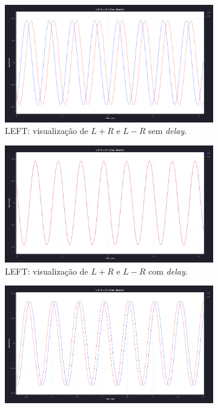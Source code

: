 \begin{figure}[ht] 
    \begin{subfigure}[b]{0.5\linewidth}
        \centering
        \includegraphics[width=0.9\linewidth]{img/peculiaridades/LEFT_sem_delay.png}
        \caption{LEFT: visualização de $L+R$ e $L-R$ sem \textit{delay}.} 
        \label{fig:a} 
        \vspace{4ex}
    \end{subfigure}%
    \begin{subfigure}[b]{0.5\linewidth}
        \centering
        \includegraphics[width=0.9\linewidth]{img/peculiaridades/LEFT_com_delay.png} 
        \caption{LEFT: visualização de $L+R$ e $L-R$ com \textit{delay}.} 
        \label{fig:b} 
        \vspace{4ex}
    \end{subfigure} 
    \begin{subfigure}[b]{0.5\linewidth}
        \centering
        \includegraphics[width=0.9\linewidth]{img/peculiaridades/RIGHT_sem_delay.png}

\end{subfigure}
\end{figure}
